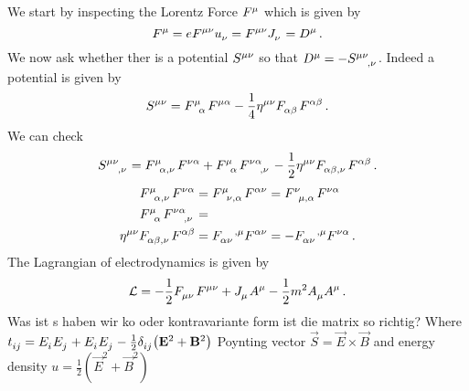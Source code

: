 \begin{example}[Electrodynamics]
We start by inspecting the Lorentz Force $\tensor{F}{^\mu}$ which is given by
\begin{equation}
\tensor{F}{^\mu}=e\tensor{F}{^\mu^\nu}\tensor{u}{_\nu}=\tensor{F}{^\mu^\nu}\tensor{J}{_\nu}=\tensor{D}{^\mu}\,
.
\end{equation}
We now ask whether ther is a potential $\tensor{S}{^\mu^\nu}$ so that
$\tensor{D}{^\mu}=-\tensor{S}{^\mu^\nu_{,\nu}}$. Indeed a potential is given by 
\begin{equation}
\tensor{S}{^\mu^\nu}=\tensor{F}{^\mu_\alpha}\tensor{F}{^\mu^\alpha}-\frac{1}{4}\tensor{\eta}{^\mu^\nu}\tensor{F}{_\alpha_\beta}\tensor{F}{^\alpha^\beta}\,
.
\end{equation}
We can check 
\begin{equation}
\tensor{S}{^\mu^\nu_{,\nu}}=\tensor{F}{^\mu_\alpha_{,\nu}}\tensor{F}{^\nu^\alpha}+
\tensor{F}{^\mu_\alpha}\tensor{F}{^\nu^\alpha_{,\nu}}
-\frac{1}{2}\tensor{\eta}{^\mu^\nu}\tensor{F}{_\alpha_\beta_{,\nu}}\tensor{F}{^\alpha^\beta}\,
.
\end{equation}
\begin{align}
\tensor{F}{^\mu_\alpha_{,\nu}}\tensor{F}{^\nu^\alpha}
&=\tensor{F}{^\mu_\nu_{,\alpha}}\tensor{F}{^\alpha^\nu}
=\tensor{F}{^\nu_\mu_{,\alpha}}\tensor{F}{^\nu^\alpha}
\\
\tensor{F}{^\mu_\alpha}\tensor{F}{^\nu^\alpha_{,\nu}}&=\\
\tensor{\eta}{^\mu^\nu}\tensor{F}{_\alpha_\beta_{,\nu}}\tensor{F}{^\alpha^\beta}
&=\tensor{F}{_\alpha_\nu^{,\mu}}\tensor{F}{^\alpha^\nu}
= -\tensor{F}{_\alpha_\nu^{,\mu}}\tensor{F}{^\nu^\alpha}
\,
.
\end{align}
The Lagrangian of electrodynamics is given by
\begin{equation}
\mathcal{L}=-\frac{1}{2}\tensor{F}{_\mu_\nu}\tensor{F}{^\mu^\nu}+\tensor{J}{_\mu}\tensor{A}{^\mu}-\frac{1}{2}m^2\tensor{A}{_\mu}\tensor{A}{^\mu}\,
.
\end{equation}
Was ist s haben wir ko oder kontravariante form ist die matrix so richtig?
Where
$\tensor{t}{_i_j}=\tensor{E}{_i}\tensor{E}{_j}+\tensor{E}{_i}\tensor{E}{_j}-\frac{1}{2}\tensor{\delta}{_i_j}\left(\vec{E}^2+\vec{B}^2\right)$
Poynting vector $\vec{S}=\vec{E}\times\vec{B}$ and energy density $u
=\frac{1}{2}\left(\vec{E}^2+\vec{B}^2\right)$
\end{example}
